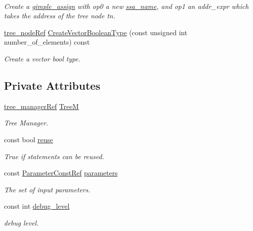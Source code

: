 \begin{DoxyCompactItemize}
$$\begin{DoxyCompactList}\small\item\em Create a \hyperlink{structgimple__assign}{gimple\+\_\+assign} with op0 a new \hyperlink{structssa__name}{ssa\+\_\+name}, and op1 an addr\+\_\+expr which takes the address of the tree node tn. \end{DoxyCompactList}\item 
\hyperlink{tree__node_8hpp_a6ee377554d1c4871ad66a337eaa67fd5}{tree\+\_\+node\+Ref} \hyperlink{classtree__manipulation_a29640c2e27ae3aafa292806da7921110}{Create\+Vector\+Boolean\+Type} (const unsigned int number\+\_\+of\+\_\+elements) const
\begin{DoxyCompactList}\small\item\em Create a vector bool type. \end{DoxyCompactList}\end{DoxyCompactItemize}
\subsection*{Private Attributes}
\begin{DoxyCompactItemize}
\item 
\hyperlink{tree__manager_8hpp_a96ff150c071ce11a9a7a1e40590f205e}{tree\+\_\+manager\+Ref} \hyperlink{classtree__manipulation_aee245cc376915c8ec6cff7d8636aa411}{TreeM}
\begin{DoxyCompactList}\small\item\em Tree Manager. \end{DoxyCompactList}\item 
const bool \hyperlink{classtree__manipulation_ae8bc97e6e8bed52cff1080b44ea46ba4}{reuse}
\begin{DoxyCompactList}\small\item\em True if statements can be reused. \end{DoxyCompactList}\item 
const \hyperlink{Parameter_8hpp_a37841774a6fcb479b597fdf8955eb4ea}{Parameter\+Const\+Ref} \hyperlink{classtree__manipulation_a33e7af50148a33e3f8ef9621c094fa1a}{parameters}
\begin{DoxyCompactList}\small\item\em The set of input parameters. \end{DoxyCompactList}\item 
const int \hyperlink{classtree__manipulation_af0c337fee167d92263ac4783583a12a0}{debug\+\_\+level}
\begin{DoxyCompactList}\small\item\em debug level. \end{DoxyCompactList}\end{DoxyCompactItemize}

